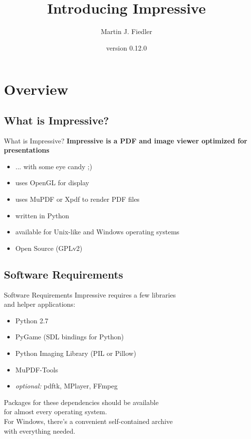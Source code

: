 \documentclass[bigger,hyperref={colorlinks=true,linkcolor=white,urlcolor=blue}]{beamer}
\title{Introducing Impressive}
\author{Martin J. Fiedler}
\date{version 0.12.0}
\begin{document}
\maketitle


\section{Overview}

\subsection{What is Impressive?}
\begin{frame}{What is Impressive?}
    \large
    \textbf{Impressive is a PDF and image viewer optimized for presentations}
    \normalsize
    \begin{itemize}
        \item ... with some eye candy ;)
        \item uses OpenGL for display
        \item uses MuPDF or Xpdf to render PDF files
        \item written in Python
        \item available for Unix-like and Windows operating systems
        \item Open Source (GPLv2)
    \end{itemize}
\end{frame}

\subsection{Software Requirements}
\begin{frame}{Software Requirements}
    Impressive requires a few libraries \\ and helper applications:
    \begin{itemize}
        \item Python 2.7
        \item PyGame (SDL bindings for Python)
        \item Python Imaging Library (PIL or Pillow)
        \item MuPDF-Tools
        \item \emph{optional:} pdftk, MPlayer, FFmpeg
    \end{itemize}
    Packages for these dependencies should be available \\
    for almost every operating system. \\
    For Windows, there's a convenient self-contained archive \\
    with everything needed.
\end{frame}
\end{document}
